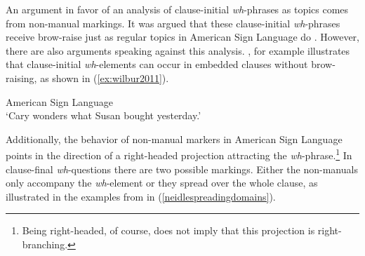 %
%
%


\noindent An argument in favor of an analysis of clause-initial \textit{wh}-phrases as topics comes from non-manual markings. It was argued that these clause-initial \textit{wh}-phrases receive brow-raise just as regular topics in American Sign Language do \citep{neidle1998rightward, neidle2000syntax}. However, there are also arguments speaking against this analysis. \citet{wilbur2011nonmanuals}, for example illustrates that clause-initial \textit{wh}-elements can occur in embedded clauses without brow-raising, as shown in (\ref{ex:wilbur2011}).

\begin{exe}
\ex American Sign Language \citep[160]{wilbur2011nonmanuals} \\  
\glt `Cary wonders what Susan bought yesterday.' \label{ex:wilbur2011} 
\end{exe}

\noindent Additionally, the behavior of non-manual markers in American Sign Language points in the direction of a right-headed projection attracting the \textit{wh}-phrase.\footnote{Being right-headed, of course, does not imply that this projection is right-branching.} In clause-final \textit{wh}-questions there are two possible markings. Either the non-manuals only accompany the \textit{wh}-element or they spread over the whole clause, as illustrated in the examples from \citet[76]{neidle2002language} in (\ref{neidlespreadingdomains}). 

